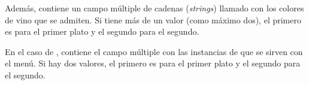 Además,  contiene un campo múltiple de cadenas
(\emph{strings}) llamado  con los colores de vino que se
admiten. Si tiene más de un valor (como máximo dos), el primero es para el
primer plato y el segundo para el segundo.

En el caso de , contiene el campo múltiple  con las
instancias de  que se sirven con el menú. Si hay dos valores, el
primero es para el primer plato y el segundo para el segundo.
